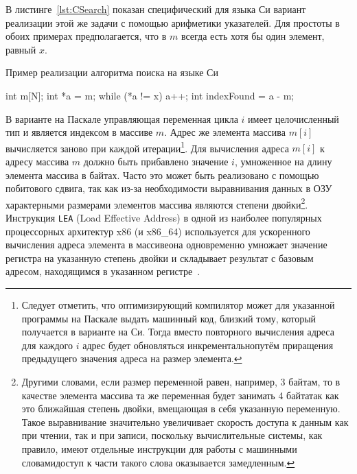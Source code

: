 \documentclass[utf8]{lgu}
\newcommand{\tire}{\unskip\nobreak\thinspace\textemdash\thinspace}
\newcommand{\code}[1]{{\normalsize\texttt{#1}}}
\begin{document}
В листинге~\ref{lst:CSearch} показан специфический для языка Си вариант реализации этой же задачи с помощью арифметики указателей. Для простоты в обоих примерах предполагается, что в $m$ всегда есть хотя бы один элемент, равный $x$.

\begin{listing}[H]
\caption{Пример реализации алгоритма поиска на языке Си}
\label{lst:CSearch}
\vspace{-17pt}
\begin{cc}
int m[N];
int *a = m;
while (*a != x) a++;
int indexFound = a - m;
\end{cc}
\end{listing}

В варианте на Паскале управляющая переменная цикла $i$ имеет целочисленный тип и является индексом в массиве $m$. Адрес же элемента массива $m[i]$ вычисляется заново при каждой итерации\footnote{Следует отметить, что оптимизирующий компилятор может для указанной программы на Паскале выдать машинный код, близкий тому, который получается в варианте на Си. Тогда вместо повторного вычисления адреса для каждого $i$ адрес будет обновляться инкрементально\tire путём приращения предыдущего значения адреса на размер элемента.}. Для вычисления адреса $m[i]$ к адресу массива $m$ должно быть прибавлено значение $i$, умноженное на длину элемента массива в байтах. Часто это может быть реализовано с помощью побитового сдвига, так как из-за необходимости выравнивания данных в ОЗУ~\cite[с.~43]{WirthCompiler} характерными размерами элементов массива являются степени двойки\footnote{Другими словами, если размер переменной равен, например, 3 байтам, то в качестве элемента массива та же переменная будет занимать 4 байта\tire так как это ближайшая степень двойки, вмещающая в себя указанную переменную. Такое выравнивание значительно увеличивает скорость доступа к данным как при чтении, так и при записи, поскольку вычислительные системы, как правило, имеют отдельные инструкции для работы с машинными словами\tire доступ к части такого слова оказывается замедленным.}. Инструкция \code{LEA} (Load Effective Address) в одной из наиболее популярных процессорных архитектур x86 (и x86\_64) используется для ускоренного вычисления адреса элемента в массиве\tire она одновременно умножает значение регистра на указанную степень двойки и складывает результат с базовым адресом, находящимся в указанном регистре~\cite{x86and64}.

\begin{asm}[linenos=false]
mov eax, [edi + esi*4]  ; загружает значение array[esi]}
lea  eax, [edi + esi*4]  ; вычисляет адрес array[esi]
\end{asm}
\end{document}
